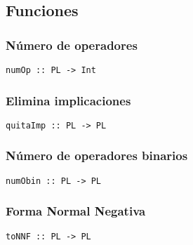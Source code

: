 \documentclass[11pt]{article}
\begin{document}
\subsection{Funciones}
\label{sec:org762f21b}
\subsubsection{Número de operadores}
\label{sec:org4e643d4}
\begin{verbatim}
numOp :: PL -> Int
\end{verbatim}
\subsubsection{Elimina implicaciones}
\label{sec:org758fa73}
\begin{verbatim}
quitaImp :: PL -> PL
\end{verbatim}
\subsubsection{Número de operadores binarios}
\label{sec:org0126bc1}
\begin{verbatim}
numObin :: PL -> PL
\end{verbatim}
\subsubsection{Forma Normal Negativa}
\label{sec:org24c0893}
\begin{verbatim}
toNNF :: PL -> PL
\end{verbatim}
\end{document}
